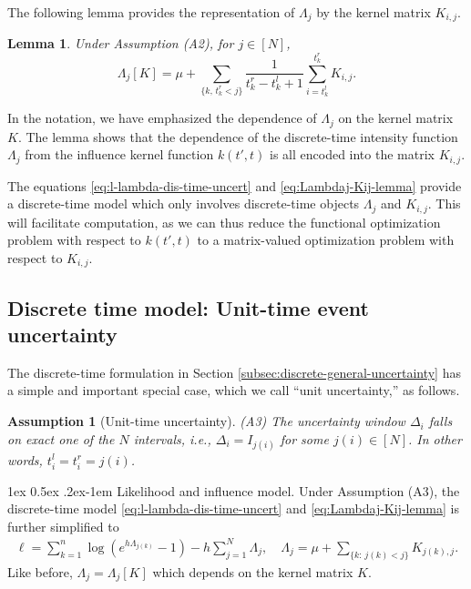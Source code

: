 \documentclass[11pt]{article}
\makeatletter
\newtheorem{lemma}[theorem]{Lemma}
\newtheorem{assumption}{Assumption}
\theoremstyle{remark}
\theoremstyle{plain}
\renewcommand{\paragraph}{%
  \@startsection{paragraph}{4}%
  {\z@}{1ex \@plus 0.5ex \@minus .2ex}{-1em}%
  {\normalfont\normalsize\itshape}%
}
\makeatother
\begin{document}
The following lemma provides the representation of $\Lambda_j$ by the kernel matrix $K_{i,j}$.
%
\begin{lemma}\label{lemma:Lambdaj-Kij-lemma}
Under Assumption (A2),
for $j \in [N]$, 
\begin{equation}\label{eq:Lambdaj-Kij-lemma}
\Lambda_j[K] = 
     \mu+ \sum_{\{k, \, t_k^r < j\} } \frac{1}{ t_k^r - t_k^l+1} \sum_{i=t_k^l}^{t_k^r} K_{i,j}.
\end{equation}
\end{lemma}
In the notation, we have emphasized the dependence of $\Lambda_j$ on the kernel matrix $K$.
The lemma shows that the dependence of the discrete-time intensity function $\Lambda_j$ 
from the influence kernel function $k(t',t)$ is all encoded into the matrix $K_{i,j}$. 



The equations \eqref{eq:l-lambda-dis-time-uncert} and \eqref{eq:Lambdaj-Kij-lemma} provide a discrete-time model which only involves discrete-time objects $\Lambda_j$ and $K_{i,j}$. 
This will facilitate computation, as we can thus reduce the functional optimization problem with respect to  $k(t',t)$ 
to a matrix-valued optimization problem with respect to $K_{i,j}$. 


\subsection{Discrete time model: Unit-time event uncertainty}\label{subsec:bernoulli-time-only}


The discrete-time formulation in Section \ref{subsec:discrete-general-uncertainty} has a simple and important special case,
which we call ``unit uncertainty,'' as follows.

\begin{assumption}[Unit-time uncertainty]\label{assump:A3}
(A3) The uncertainty window $\Delta_i$ falls on exact one of the $N$ intervals, i.e., $\Delta_i = I_{j(i)}$ for some $j(i) \in [N]$.
In other words, $t_i^l = t_i^r = j(i)$.
\end{assumption}

\paragraph{Likelihood and influence model.}
Under Assumption (A3),  the discrete-time model  \eqref{eq:l-lambda-dis-time-uncert} and \eqref{eq:Lambdaj-Kij-lemma} is further simplified to
\begin{align}\label{eq:model-base-uncert}
\ell 
 = \sum_{k=1}^n \log \left( e^{ h     \Lambda_{j(k) } }   - 1 \right)
    -   h   \sum_{j=1}^N  \Lambda_j,
    \quad 
\Lambda_j  
  =  \mu+ \sum_{\{k: \, j(k) < j\} }  K_{j(k), j}.
\end{align}
Like before, $\Lambda_j = \Lambda_j[K]$ which depends on the kernel matrix $K$.  
\end{document}
